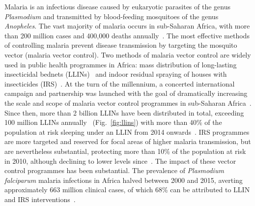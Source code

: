 \begin{refsection}
Malaria is an infectious disease caused by eukaryotic parasites of the genus \textit{Plasmodium} and transmitted by blood-feeding mosquitoes of the genus \textit{Anopheles}.
%
The vast majority of malaria occurs in sub-Saharan Africa, with more than 200 million cases and 400,000 deaths annually~\parencite{WHO2019WMR}.
%
The most effective methods of controlling malaria prevent disease transmission by targeting the mosquito vector (malaria vector control).
%
Two methods of malaria vector control are widely used in public health programmes in Africa: mass distribution of long-lasting insecticidal bednets (LLINs)~\parencite{Carnevale2019,Okumu2020} and indoor residual spraying of houses with insecticides (IRS)~\parencite{WHO2006IRS,Pluess2010,Choi2019}.
%
At the turn of the millennium, a concerted international campaign and partnership was launched with the goal of dramatically increasing the scale and scope of malaria vector control programmes in sub-Saharan Africa~\parencite{Nabarro1998}.
%
Since then, more than 2 billion LLINs have been distributed in total, exceeding 100 million LLINs annually~\parencite{AMP2020} (Fig.~\ref{fig:llins}) with more than 40\% of the population at risk sleeping under an LLIN from 2014 onwards~\parencite{Bhatt2015,WHO2019WMR}.
%
IRS programmes are more targeted and reserved for focal areas of higher malaria transmission, but are nevertheless substantial, protecting more than 10\% of the population at risk in 2010, although declining to lower levels since~\parencite{Bhatt2015,WHO2019WMR,Tangena2020}. 
%
The impact of these vector control programmes has been substantial. 
%
The prevalence of \textit{Plasmodium falciparum} malaria infections in Africa halved between 2000 and 2015, averting approximately 663 million clinical cases, of which 68\% can be attributed to LLIN and IRS interventions~\parencite{Bhatt2015}.



\end{refsection}
